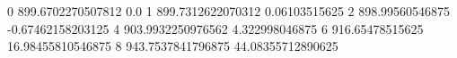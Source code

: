 0 899.6702270507812 0.0
1 899.7312622070312 0.06103515625
2 898.99560546875 -0.67462158203125
4 903.9932250976562 4.322998046875
6 916.65478515625 16.98455810546875
8 943.7537841796875 44.08355712890625
